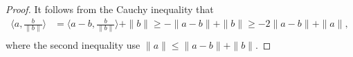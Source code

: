 \documentclass[10pt,a4paper]{amsart}
\begin{document}
\begin{proof}
  It follows from the Cauchy inequality that
\begin{equation}
\begin{aligned}
    \langle a, \frac{b}{\|b\|} \rangle & =   \langle a - b, \frac{b}{\|b\|} \rangle + \|b\| \geq -\|a - b\| + \|b\| \geq  - 2\| a-b \| + \|a\|, \\
    \end{aligned}
\end{equation}
where the second inequality use $\|a\| \leq \|a - b\| + \|b\|$.
\end{proof}
\end{document}
